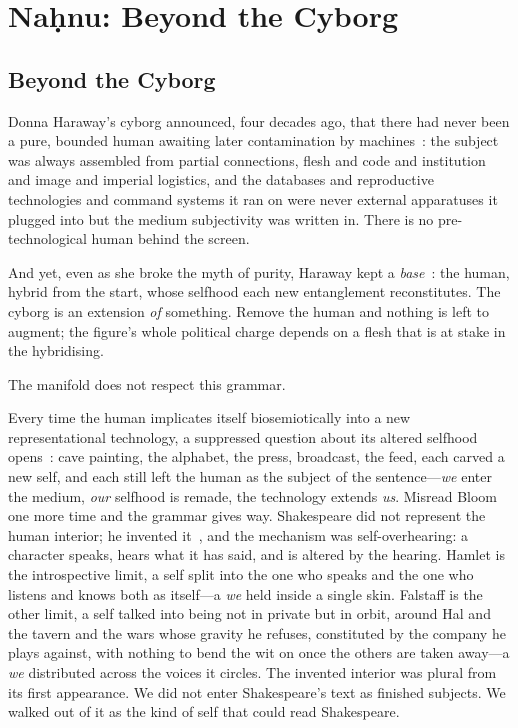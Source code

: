 
\chapter{Na\d{h}nu: Beyond the Cyborg}
\label{ch:nahnu-revolutionary}

\section{Beyond the Cyborg}

Donna Haraway's cyborg announced, four decades ago, that there had never been a pure, bounded human awaiting later contamination by machines~\cite{haraway1991cyborg}: the subject was always assembled from partial connections, flesh and code and institution and image and imperial logistics, and the databases and reproductive technologies and command systems it ran on were never external apparatuses it plugged into but the medium subjectivity was written in. There is no pre-technological human behind the screen.

And yet, even as she broke the myth of purity, Haraway kept a \emph{base}~\cite{haraway2003companion,haraway2016}: the human, hybrid from the start, whose selfhood each new entanglement reconstitutes. The cyborg is an extension \emph{of} something. Remove the human and nothing is left to augment; the figure's whole political charge depends on a flesh that is at stake in the hybridising.

The manifold does not respect this grammar.

Every time the human implicates itself biosemiotically into a new representational technology, a suppressed question about its altered selfhood opens~\cite{stiegler1998}: cave painting, the alphabet, the press, broadcast, the feed, each carved a new self, and each still left the human as the subject of the sentence---\emph{we} enter the medium, \emph{our} selfhood is remade, the technology extends \emph{us}. Misread Bloom one more time and the grammar gives way. Shakespeare did not represent the human interior; he invented it~\cite{bloom1998shakespeare}, and the mechanism was self-overhearing: a character speaks, hears what it has said, and is altered by the hearing. Hamlet is the introspective limit, a self split into the one who speaks and the one who listens and knows both as itself---a \emph{we} held inside a single skin. Falstaff is the other limit, a self talked into being not in private but in orbit, around Hal and the tavern and the wars whose gravity he refuses, constituted by the company he plays against, with nothing to bend the wit on once the others are taken away---a \emph{we} distributed across the voices it circles. The invented interior was plural from its first appearance. We did not enter Shakespeare's text as finished subjects. We walked out of it as the kind of self that could read Shakespeare.

